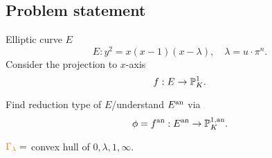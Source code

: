 \subsection{Problem statement} \label{sec:problem_statement}
\begin{frame}
	\begin{minipage}[t]{.7\textwidth}
	Elliptic curve $E$	
	\[
		E: y^2 = x(x-1)(x-\lambda), \quad \lambda = u\cdot \pi^{n}
	.\] 
	Consider the projection to $x$-axis 
	\[
	f: E \to \mathbb P^{1}_K
	.\] 
	\end{minipage}
	\begin{minipage}[t]{.29\textwidth}
	\end{minipage}


	\begin{question}
	Find reduction type of $E$/understand $E{}^{\text{an}}$ via \[
	\phi = f{}^{\text{an}} : E{}^{\text{an}} \to \mathbb P^{1, \text{an}}_K
	.\] 
	\end{question}

\end{frame}
\begin{frame}
	${\color{orange} \Gamma_\lambda} = $ convex hull of $0, \lambda, 1, \infty$.
\begin{figure}[ht]
    \centering
\end{figure}
\end{frame}



